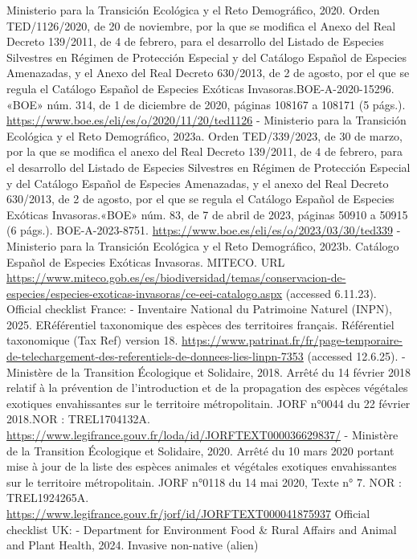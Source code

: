 \documentclass[
]{article}
\begin{document}
Ministerio para la Transición Ecológica y el Reto Demográfico, 2020.
Orden TED/1126/2020, de 20 de noviembre, por la que se modifica el Anexo
del Real Decreto 139/2011, de 4 de febrero, para el desarrollo del
Listado de Especies Silvestres en Régimen de Protección Especial y del
Catálogo Español de Especies Amenazadas, y el Anexo del Real Decreto
630/2013, de 2 de agosto, por el que se regula el Catálogo Español de
Especies Exóticas Invasoras.BOE-A-2020-15296. «BOE» núm. 314, de 1 de
diciembre de 2020, páginas 108167 a 108171 (5 págs.).
\url{https://www.boe.es/eli/es/o/2020/11/20/ted1126} - Ministerio para
la Transición Ecológica y el Reto Demográfico, 2023a. Orden
TED/339/2023, de 30 de marzo, por la que se modifica el anexo del Real
Decreto 139/2011, de 4 de febrero, para el desarrollo del Listado de
Especies Silvestres en Régimen de Protección Especial y del Catálogo
Español de Especies Amenazadas, y el anexo del Real Decreto 630/2013, de
2 de agosto, por el que se regula el Catálogo Español de Especies
Exóticas Invasoras.«BOE» núm. 83, de 7 de abril de 2023, páginas 50910 a
50915 (6 págs.). BOE-A-2023-8751.
\url{https://www.boe.es/eli/es/o/2023/03/30/ted339} - Ministerio para la
Transición Ecológica y el Reto Demográfico, 2023b. Catálogo Español de
Especies Exóticas Invasoras. MITECO. URL
\url{https://www.miteco.gob.es/es/biodiversidad/temas/conservacion-de-especies/especies-exoticas-invasoras/ce-eei-catalogo.aspx}
(accessed 6.11.23). Official checklist France: - Inventaire National du
Patrimoine Naturel (INPN), 2025. ERéférentiel taxonomique des espèces
des territoires français. Référentiel taxonomique (Tax Ref) version 18.
\url{https://www.patrinat.fr/fr/page-temporaire-de-telechargement-des-referentiels-de-donnees-lies-linpn-7353}
(accessed 12.6.25). - Ministère de la Transition Écologique et
Solidaire, 2018. Arrêté du 14 février 2018 relatif à la prévention de
l'introduction et de la propagation des espèces végétales exotiques
envahissantes sur le territoire métropolitain. JORF n°0044 du 22 février
2018.NOR : TREL1704132A.
\url{https://www.legifrance.gouv.fr/loda/id/JORFTEXT000036629837/} -
Ministère de la Transition Écologique et Solidaire, 2020. Arrêté du 10
mars 2020 portant mise à jour de la liste des espèces animales et
végétales exotiques envahissantes sur le territoire métropolitain. JORF
n°0118 du 14 mai 2020, Texte n° 7. NOR : TREL1924265A.
\url{https://www.legifrance.gouv.fr/jorf/id/JORFTEXT000041875937}
Official checklist UK: - Department for Environment Food \& Rural
Affairs and Animal and Plant Health, 2024. Invasive non-native (alien)
\end{document}
